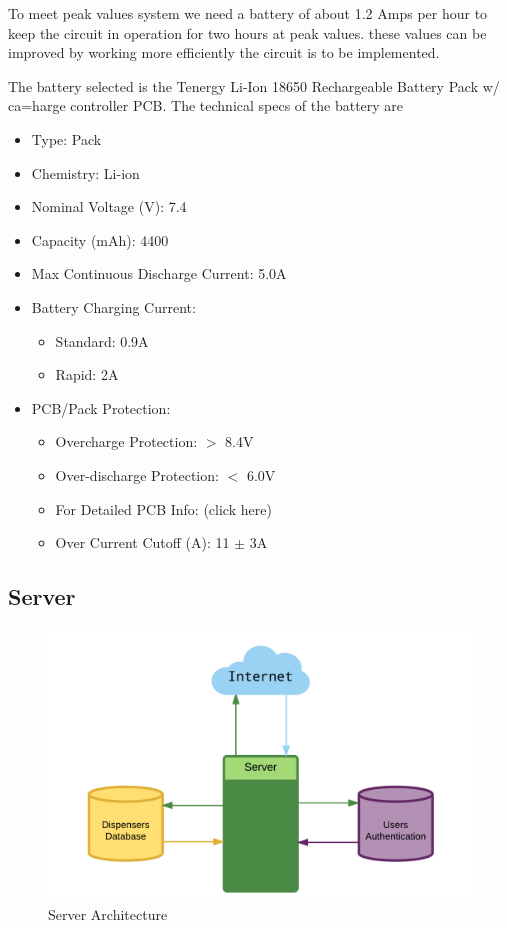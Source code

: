 \documentclass[12pt]{article}
\begin{document}
To meet peak values system we need a battery of about 1.2 Amps per hour to keep the circuit in operation for two hours at peak values. these values can be improved by working more efficiently the circuit is to be implemented.

The battery selected is the Tenergy Li-Ion 18650 Rechargeable Battery Pack w/ ca=harge controller PCB. The technical specs of the battery are

\begin{itemize}
  \item Type: Pack
  \item Chemistry: Li-ion
  \item Nominal Voltage (V): 7.4
  \item Capacity (mAh): 4400
  \item Max Continuous Discharge Current: 5.0A
  \item Battery Charging Current:
  \begin{itemize}
    \item Standard: 0.9A
    \item Rapid: 2A
  \end{itemize}
  \item PCB/Pack Protection:
  \begin{itemize}
    \item Overcharge Protection: $>$ 8.4V
    \item Over-discharge Protection: $<$ 6.0V
    \item For Detailed PCB Info: (click here)
    \item Over Current Cutoff (A): 11 $\pm$ 3A
  \end{itemize}
\end{itemize}

\subsection{Server}

\begin{figure}[!htb]
  \includegraphics[width=\textwidth]{Figures/ArchitectureServer}
  \caption{Server Architecture}
  \label{fig:ServArchitecture}
\end{figure}
\end{document}
